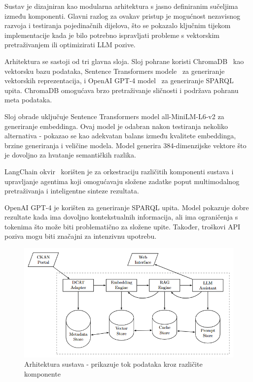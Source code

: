 Sustav je dizajniran kao modularna arhitektura s jasno definiranim sučeljima između komponenti. Glavni razlog za ovakav pristup je mogućnost nezavisnog razvoja i testiranja pojedinačnih dijelova, što se pokazalo ključnim tijekom implementacije kada je bilo potrebno ispravljati probleme s vektorskim pretraživanjem ili optimizirati LLM pozive.

Arhitektura se sastoji od tri glavna sloja. Sloj pohrane koristi ChromaDB~\cite{wang2023vector} kao vektorsku bazu podataka, Sentence Transformers modele~\cite{reimers2019sentence} za generiranje vektorskih reprezentacija, i OpenAI GPT-4 model~\cite{brown2020language} za generiranje SPARQL upita. ChromaDB omogućava brzo pretraživanje sličnosti i podržava pohranu meta podataka.

Sloj obrade uključuje Sentence Transformers model all-MiniLM-L6-v2 za generiranje embeddinga. Ovaj model je odabran nakon testiranja nekoliko alternativa - pokazao se kao adekvatan balans između kvalitete embeddinga, brzine generiranja i veličine modela. Model generira 384-dimenzijske vektore što je dovoljno za hvatanje semantičkih razlika.

LangChain okvir~\cite{liu2023survey} korišten je za orkestraciju različitih komponenti sustava i upravljanje agentima koji omogućavaju složene zadatke poput multimodalnog pretraživanja i inteligentne sinteze rezultata.

OpenAI GPT-4 je korišten za generiranje SPARQL upita. Model pokazuje dobre rezultate kada ima dovoljno kontekstualnih informacija, ali ima ograničenja s tokenima što može biti problematično za složene upite. Također, troškovi API poziva mogu biti značajni za intenzivnu upotrebu.

\begin{figure}[htbp]
    \centering
    \includegraphics[width=1\textwidth]{figures/system_architecture.png}
    \caption{Arhitektura sustava - prikazuje tok podataka kroz različite komponente}
    \label{fig:system_architecture}
\end{figure}

